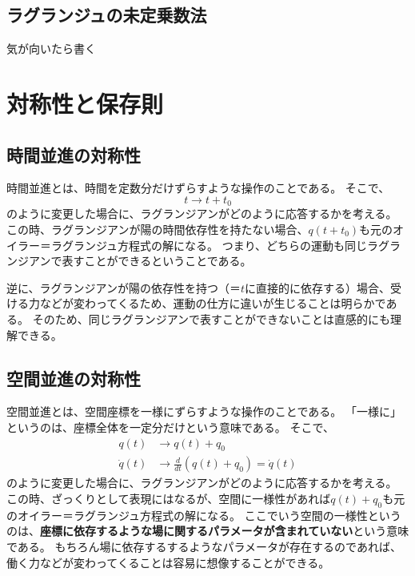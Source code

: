 \documentclass[a4paper]{jsreport}
\begin{document}
        \section{ラグランジュの未定乗数法}
            気が向いたら書く

    \chapter{対称性と保存則}
        \section{時間並進の対称性}
            時間並進とは、時間を定数分だけずらすような操作のことである。
            そこで、
            \begin{equation}
                t \to t + t_0
            \end{equation}
            のように変更した場合に、ラグランジアンがどのように応答するかを考える。
            この時、ラグランジアンが陽の時間依存性を持たない場合、$q(t+t_0)$も元のオイラー＝ラグランジュ方程式の解になる。
            つまり、どちらの運動も同じラグランジアンで表すことができるということである。\par
            逆に、ラグランジアンが陽の依存性を持つ（＝$t$に直接的に依存する）場合、受ける力などが変わってくるため、運動の仕方に違いが生じることは明らかである。
            そのため、同じラグランジアンで表すことができないことは直感的にも理解できる。

        \section{空間並進の対称性}
            空間並進とは、空間座標を一様にずらすような操作のことである。
            「一様に」というのは、座標全体を一定分だけという意味である。
            そこで、
            \begin{align}
                q(t) &\to q(t) + q_0 \\
                \dot{q}(t) &\to \frac{d}{dt} ({q(t)} + q_0) = \dot{q}(t)
            \end{align}
            のように変更した場合に、ラグランジアンがどのように応答するかを考える。
            この時、ざっくりとして表現にはなるが、空間に一様性があれば$q(t) + q_0$も元のオイラー＝ラグランジュ方程式の解になる。
            ここでいう空間の一様性というのは、\textbf{座標に依存するような場に関するパラメータが含まれていない}という意味である。
            もちろん場に依存するするようなパラメータが存在するのであれば、働く力などが変わってくることは容易に想像することができる。
\end{document}
